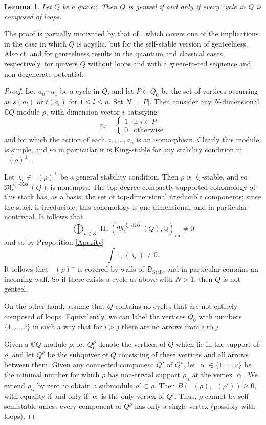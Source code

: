 \documentclass{amsart}
\newcommand{\Mst}{\mathfrak{M}}
\DeclareMathOperator{\kss}{-Kss}
\DeclareMathOperator{\HO}{H}
\DeclareMathOperator{\vir}{vir}
\DeclareMathOperator{\udim}{\underline{\dim}}
\DeclareMathOperator{\Stab}{Stab}
\let\bb=\mathbb
\let\f=\mathfrak
\renewcommand{\alpha}{\upalpha}
\renewcommand{\zeta}{\upzeta}
\theoremstyle{plain}%
\newtheorem{lem}[thm]{Lemma}
\theoremstyle{definition}
\theoremstyle{remark}
\begin{document}
\begin{lem}
\label{acyclic_genteel_new}
Let $Q$ be a quiver.  Then $Q$ is genteel if and only if every cycle in $Q$ is composed of loops.
\end{lem}
The proof is partially motivated by that of \cite[Lem 11.5]{Bridge}, which covers one of the implications in the case in which $Q$ is acyclic, but for the self-stable version of genteelness.  Also cf. \cite[Cor. 1.2(i)]{Mou} and \cite[Thm. 1.2.2]{Qin2} for genteelness results in the quantum and classical cases, respectively, for quivers $Q$ without loops and with a green-to-red sequence and non-degenerate potential.
\begin{proof}
Let $a_n\cdots a_1$ be a cycle in $Q$, and let $P\subset Q_0$ be the set of vertices occurring as $s(a_l)$ or $t(a_l)$ for $1\leq l\leq n$.  Set $N=\lvert P\lvert$.   Then consider any $N$-dimensional $\bb{C}Q$-module $\rho$, with dimension vector $v$ satisfying
\[
v_i=\begin{cases} 1 &\textrm{if }i\in P \\
0 &\textrm{otherwise}\end{cases}
\]
and for which the action of each $a_1,\ldots,a_n$ is an isomorphism.  Clearly this module is simple, and so in particular it is King-stable for any stability condition in $\udim(\rho)^{\perp}$.  

Let $\zeta\in \udim(\rho)^\perp$ be a general stability condition.  Then $\rho$ is $\zeta$-stable, and so $\Mst^{\zeta \kss}_{v}(Q)$ is nonempty.  The top degree compactly supported cohomology of this stack has, as a basis, the set of top-dimensional irreducible components; since the stack is irreducible, this cohomology is one-dimensional, and in particular nontrivial.  It follows that
\[
\bigoplus_{v\in K}\HO_c (\Mst^{\zeta \kss}_{v}(Q),\mathbb{Q})_{\vir}\neq 0
\]
and so by Proposition \ref{Apurity}
\[
\int 1_{\mathrm{ss}}(\zeta)\neq 0.
\]
It follows that $\udim(\rho)^{\perp}$ is covered by walls of $\f{D}_{\Stab}$, and in particular contains an incoming wall.  So if there exists a cycle as above with $N>1$, then $Q$ is not genteel.

On the other hand, assume that $Q$ contains no cycles that are not entirely composed of loops.  Equivalently, we can label the vertices $Q_0$ with numbers $\{1,\ldots,r\}$ in such a way that for $i>j$ there are no arrows from $i$ to $j$.

Given a $\bb{C}Q$-module $\rho$, let $Q_0^{\rho}$ denote the vertices of $Q$ which lie in the support of $\rho$, and let $Q^{\rho}$ be the subquiver of $Q$ consisting of these vertices and all arrows between them.  Given any connected component $Q'$ of $Q^{\rho}$, let $\alpha\in \{1,\ldots,r\}$ be the minimal number for which $\rho$ has non-trivial support $\rho_{\alpha}$ at the vertex $\alpha$.  We extend $\rho_{\alpha}$ by zero to obtain a submodule $\rho'\subset \rho$.  Then $B(\udim(\rho),\udim(\rho'))\geq 0$, with equality if and only if $\alpha$ is the only vertex of $Q'$.  Thus, $\rho$ cannot be self-semistable unless every component of $Q^{\rho}$ has only a single vertex (possibly with loops).


\end{proof}
\end{document}

